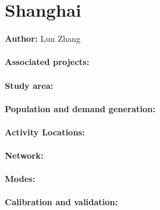 \section{Shanghai}
\label{ch:scenarios:shanghai}
\hfill \textbf{Author:} Lun Zhang

\citep[][]{WangtEtAl_TRB_2013}

\paragraph{Associated projects:}

\paragraph{Study area:}

\paragraph{Population and demand generation:}

\paragraph{Activity Locations:}

\paragraph{Network:}

\paragraph{Modes:}

\paragraph{Calibration and validation:}


